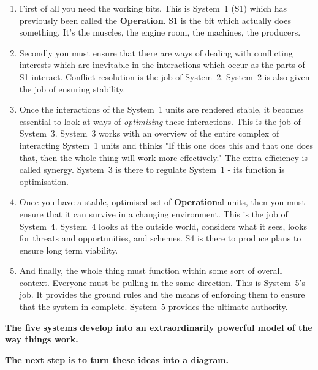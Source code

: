 \begin{enumerate}
  \item First of all you need the working bits. This is System 1 (S1) which has previously been called the \textcolor{O}{\textbf{Operation}}. S1 is the bit which actually does something. It's the muscles, the engine room, the machines, the producers.

  \item Secondly you must ensure that there are ways of dealing with conflicting interests which are inevitable in the interactions which occur as the parts of S1 interact. Conflict resolution is the job of System 2. System 2 is also given the job of ensuring stability.

  \item Once the interactions of the System 1 units are rendered stable, it becomes essential to look at ways of \textit{optimising} these interactions. This is the job of System 3. System 3 works with an overview of the entire complex of interacting System 1 units and thinks "If this one does this and that one does that, then the whole thing will work more effectively." The extra efficiency is called synergy. System 3 is there to regulate System 1 - its function is optimisation.

  \item Once you have a stable, optimised set of \textcolor{O}{\textbf{Operation}}al units, then you must ensure that it can survive in a changing environment. This is the job of System 4. System 4 looks at the outside world, considers what it sees, looks for threats and opportunities, and schemes. S4 is there to produce plans to ensure long term viability.

  \item And finally, the whole thing must function within some sort of overall context. Everyone must be pulling in the same direction. This is System 5's job. It provides the ground rules and the means of enforcing them to ensure that the system in complete. System 5 provides the ultimate authority.

\end{enumerate}

\begin{center}
	\textbf{The five systems develop into an extraordinarily powerful model of the way things work.}

	\textbf{The next step is to turn these ideas into a diagram.}
\end{center}

